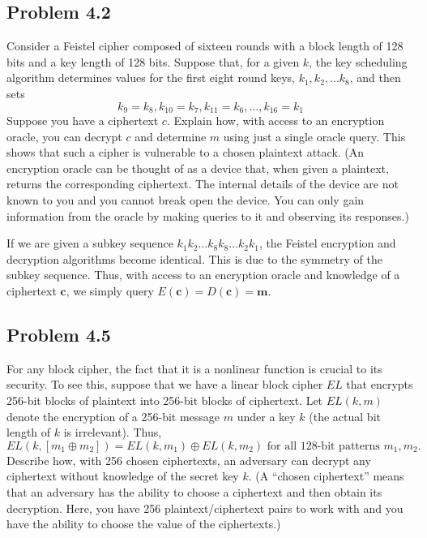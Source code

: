 \documentclass[../hw_sols.tex]{subfiles}
\begin{document}
	
\subsection*{Problem 4.2}

Consider a Feistel cipher composed of sixteen rounds with a block length of 
128 bits and a key length of 128 bits. Suppose that, for a given $k$, the key 
scheduling algorithm determines values for the first eight round keys, 
$k_1, k_2, \dots k_8$, and then sets
	$$k_9 = k_8, k_{10} = k_7, k_{11} = k_6, \dots, k_{16} = k_1$$
Suppose you have a ciphertext $c$. Explain how, with access to an encryption 
oracle, you can decrypt $c$ and determine $m$ using just a single oracle query. 
This shows that such a cipher is vulnerable to a chosen plaintext attack. (An 
encryption oracle can be thought of as a device that, when given a plaintext, 
returns the corresponding ciphertext. The internal details of the device are 
not known to you and you cannot break open the device. You can only gain 
information from the oracle by making queries to it and observing its 
responses.)

\begin{solution}
If we are given a subkey sequence $k_1 k_2 \dots k_8 k_8 \dots k_2 k_1$, 
the Feistel encryption and decryption algorithms become identical. This is 
due to the symmetry of the subkey sequence. Thus, with access to an 
encryption oracle and knowledge of a ciphertext $\mathbf{c}$, we simply query 
$E(\mathbf{c}) = D(\mathbf{c}) = \mathbf{m}$.
\end{solution}


\newpage



\subsection*{Problem 4.5}

For any block cipher, the fact that it is a nonlinear function is crucial to 
its security. To see this, suppose that we have a linear block cipher $EL$ 
that encrypts 256-bit blocks of plaintext into 256-bit blocks of ciphertext. 
Let $EL(k, m)$ denote the encryption of a 256-bit message $m$ under a key $k$ 
(the actual bit length of $k$ is irrelevant). Thus,
	$$EL(k,[m_1 \oplus m_2]) = 
	EL(k,m_1) \oplus EL(k,m_2) \text{ for all 128-bit patterns } m_1,m_2.$$
Describe how, with 256 chosen ciphertexts, an adversary can decrypt any 
ciphertext without knowledge of the secret key $k$. (A “chosen ciphertext” 
means that an adversary has the ability to choose a ciphertext and then obtain 
its decryption. Here, you have 256 plaintext/ciphertext pairs to work with and 
you have the ability to choose the value of the ciphertexts.)
\end{document}
